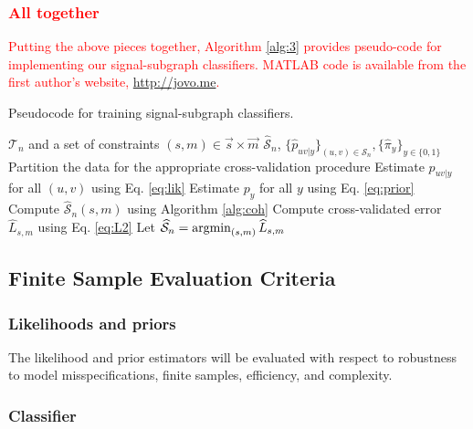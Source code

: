 \documentclass[10pt,journal,cspaper,compsoc]{IEEEtran}
\providecommand{\tr}[1]{\textcolor{red}{#1}}
\newcommand{\argmin}{\operatornamewithlimits{argmin}}
\providecommand{\mc}[1]{\mathcal{#1}}
\providecommand{\mv}[1]{\vec{#1}}
\providecommand{\wh}[1]{\widehat{#1}}
\providecommand{\mhc}[1]{\widehat{\mathcal{#1}}}
\begin{document}
\tr{\subsubsection{All together}} %
\label{ssub:all_together}

\tr{Putting the above pieces together, Algorithm \ref{alg:3} provides pseudo-code for implementing our signal-subgraph classifiers. MATLAB code is available from the first author's website, \url{http://jovo.me}.}

\begin{algorithm}
\caption{Pseudocode for training signal-subgraph classifiers.}
\label{alg:3}
\begin{algorithmic}[1]
\REQUIRE $\mc{T}_n$ and a set of constraints $(s,m) \in \mv{s} \times \mv{m}$
\ENSURE $\mhc{S}_n$, $\{\wh{p}_{uv|y}\}_{(u,v) \in \mhc{S}_n}, \{\wh{\pi}_{y}\}_{y \in \{0,1\}}$
\STATE Partition the data for the appropriate cross-validation procedure
\STATE Estimate $p_{uv|y}$ for all $(u,v)$ using Eq. \eqref{eq:lik}
\STATE Estimate $p_y$ for all $y$ using Eq. \eqref{eq:prior}
\FORALL{$(s,m) \in \mv{s} \times \mv{m}$}
\STATE Compute $\mhc{S}_n(s,m)$ using Algorithm \ref{alg:coh}
\STATE Compute cross-validated error $\wh{L}_{s,m}$ using Eq. \eqref{eq:L2}
\ENDFOR
\STATE Let $\mhc{S}_n=\argmin_{(s,m)} \wh{L}_{s,m}$ 
\end{algorithmic}
\end{algorithm}




\subsection{Finite Sample Evaluation Criteria} %
\label{sub:evaluation_criteria}


\subsubsection{Likelihoods and priors} %
\label{ssub:likelihoods_and_priors}

The likelihood and prior estimators will be evaluated with respect to robustness to model misspecifications, finite samples, efficiency, and complexity.




\subsubsection{Classifier} %
\label{ssub:classifier}
\end{document}
